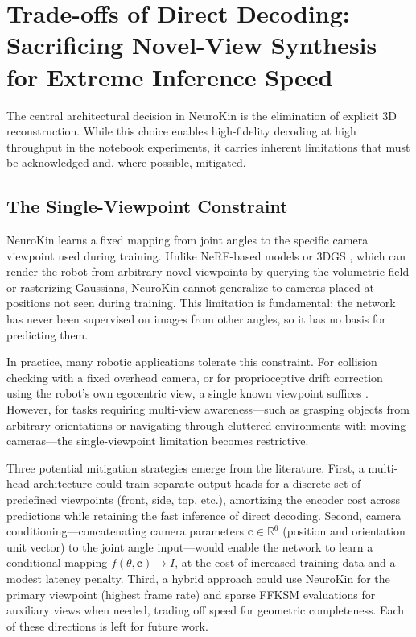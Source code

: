 \documentclass[12pt,a4paper,oneside]{report}
\begin{document}
\section{Trade-offs of Direct Decoding: Sacrificing Novel-View Synthesis for Extreme Inference Speed}

The central architectural decision in NeuroKin is the elimination of explicit 3D reconstruction. While this choice enables high-fidelity decoding at high throughput in the notebook experiments, it carries inherent limitations that must be acknowledged and, where possible, mitigated.

\subsection{The Single-Viewpoint Constraint}

NeuroKin learns a fixed mapping from joint angles to the specific camera viewpoint used during training. Unlike NeRF-based models \cite{mildenhall2020nerf} or 3DGS \cite{kerbl20233d}, which can render the robot from arbitrary novel viewpoints by querying the volumetric field or rasterizing Gaussians, NeuroKin cannot generalize to cameras placed at positions not seen during training. This limitation is fundamental: the network has never been supervised on images from other angles, so it has no basis for predicting them.

In practice, many robotic applications tolerate this constraint. For collision checking with a fixed overhead camera, or for proprioceptive drift correction using the robot's own egocentric view, a single known viewpoint suffices \cite{hu2024teaching, chen2022full}. However, for tasks requiring multi-view awareness—such as grasping objects from arbitrary orientations or navigating through cluttered environments with moving cameras—the single-viewpoint limitation becomes restrictive.

Three potential mitigation strategies emerge from the literature. First, a multi-head architecture could train separate output heads for a discrete set of predefined viewpoints (front, side, top, etc.), amortizing the encoder cost across predictions while retaining the fast inference of direct decoding. Second, camera conditioning—concatenating camera parameters $\mathbf{c} \in \mathbb{R}^6$ (position and orientation unit vector) to the joint angle input—would enable the network to learn a conditional mapping $f(\theta, \mathbf{c}) \rightarrow I$, at the cost of increased training data and a modest latency penalty. Third, a hybrid approach could use NeuroKin for the primary viewpoint (highest frame rate) and sparse FFKSM evaluations for auxiliary views when needed, trading off speed for geometric completeness. Each of these directions is left for future work.
\end{document}
